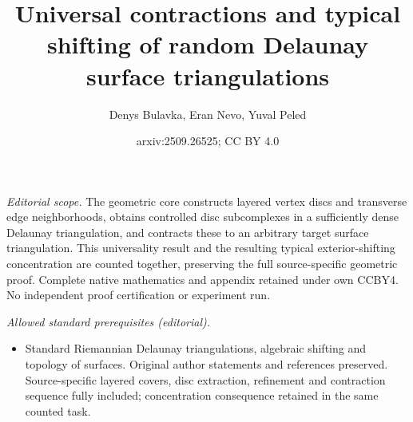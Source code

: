 \documentclass[11pt]{article}
\title{Universal contractions and typical shifting of random Delaunay surface triangulations}
\author{Denys Bulavka, Eran Nevo, Yuval Peled}
\date{arxiv:2509.26525; CC BY 4.0}
\numberwithin{claimcounter}{theorem}
\theoremstyle{remark}
\theoremstyle{definition}
\numberwithin{theorem}{section}
\begin{document}
\maketitle
\noindent\textit{Editorial scope.} The geometric core constructs layered vertex discs and transverse edge neighborhoods, obtains controlled disc subcomplexes in a sufficiently dense Delaunay triangulation, and contracts these to an arbitrary target surface triangulation. This universality result and the resulting typical exterior-shifting concentration are counted together, preserving the full source-specific geometric proof. Complete native mathematics and appendix retained under own CCBY4. No independent proof certification or experiment run.\par\medskip
\noindent\textit{Allowed standard prerequisites (editorial).}\begin{itemize}
\item Standard Riemannian Delaunay triangulations, algebraic shifting and topology of surfaces. Original author statements and references preserved. Source-specific layered covers, disc extraction, refinement and contraction sequence fully included; concentration consequence retained in the same counted task.
\end{itemize}\medskip
\end{document}
